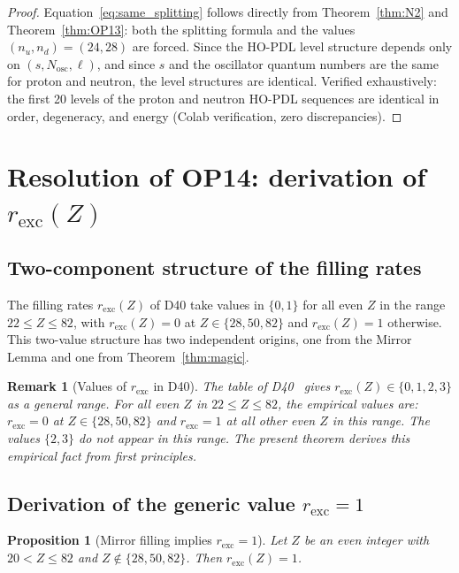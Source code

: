 \documentclass[12pt,a4paper]{article}
\newtheorem{proposition}[theorem]{Proposition}
\newtheorem{remark}[theorem]{Remark}
\newcommand{\nuu}{n_u}
\newcommand{\ndd}{n_d}
\newcommand{\rexc}{r_{\mathrm{exc}}}
\begin{document}
\begin{proof}
Equation~\eqref{eq:same_splitting} follows directly from Theorem~\ref{thm:N2} and Theorem~\ref{thm:OP13}: both the splitting formula and the values $(\nuu, \ndd) = (24, 28)$ are forced. Since the HO-PDL level structure depends only on $(s, N_{\mathrm{osc}}, \ell)$, and since $s$ and the oscillator quantum numbers are the same for proton and neutron, the level structures are identical. Verified exhaustively: the first 20 levels of the proton and neutron HO-PDL sequences are identical in order, degeneracy, and energy (Colab verification, zero discrepancies).
\end{proof}

\section{Resolution of OP14: derivation of \texorpdfstring{$\rexc(Z)$}{r\_exc(Z)}}
\label{sec:OP14}

\subsection{Two-component structure of the filling rates}

The filling rates $\rexc(Z)$ of D40 take values in $\{0, 1\}$ for all even $Z$ in the range $22 \leq Z \leq 82$, with $\rexc(Z) = 0$ at $Z \in \{28, 50, 82\}$ and $\rexc(Z) = 1$ otherwise. This two-value structure has two independent origins, one from the Mirror Lemma and one from Theorem~\ref{thm:magic}.

\begin{remark}[Values of $\rexc$ in D40]
The table of D40~\cite{PDL_D40_2026} gives $\rexc(Z) \in \{0,1,2,3\}$ as a general range. For all even $Z$ in $22 \leq Z \leq 82$, the empirical values are: $\rexc = 0$ at $Z \in \{28,50,82\}$ and $\rexc = 1$ at all other even $Z$ in this range. The values $\{2,3\}$ do not appear in this range. The present theorem derives this empirical fact from first principles.
\end{remark}

\subsection{Derivation of the generic value \texorpdfstring{$\rexc = 1$}{r\_exc = 1}}

\begin{proposition}[Mirror filling implies $\rexc = 1$]
\label{prop:rexc1}
Let $Z$ be an even integer with $20 < Z \leq 82$ and $Z \notin \{28, 50, 82\}$. Then $\rexc(Z) = 1$.
\end{proposition}
\end{document}

